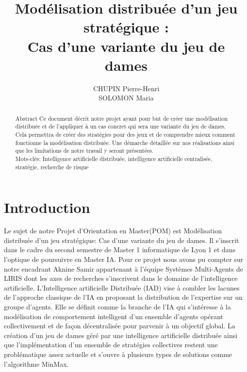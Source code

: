\documentclass[11pt]{article} %
\title{Modélisation distribuée d’un jeu stratégique : 
 \\ Cas d'une variante du jeu de dames}
\author{CHUPIN Pierre-Henri \\ SOLOMON Maria}
\date{} %
\begin{document}
\maketitle

\begin{abstract}
Abstract
Ce document décrit notre projet ayant pour  but  de  créer  une modélisation distribuée et de l'appliquer à un cas concret qui sera une variante du jeu de dames. Cela permettra de créer des stratégies pour des jeux et de comprendre mieux comment fonctionne la modélisation distribuée. Une démarche détaillée sur nos réalisations ainsi que les limitations de notre travail y seront présentées.  \\
Mots-clés: Intelligence artificielle distribuée, intelligence artificielle centralisée, stratégie, recherche de risque
\end{abstract}



\section{Introduction}
Le sujet de notre Projet d’Orientation en Master(POM) est Modélisation distribuée d’un jeu stratégique: Cas d'une variante du jeu de dames. Il s'inscrit dans le cadre du second semestre de Master 1 informatique de Lyon 1 et dans l'optique de poursuivre en Master IA. Pour ce projet nous avons pu compter sur notre encadrant Aknine Samir appartenant à l'équipe Systèmes Multi-Agents de LIRIS dont les axes de recherches s’inscrivent dans le domaine de l'intelligence artificielle. 
L’Intelligence artificielle Distribuée (IAD) vise à combler les lacunes de l’approche classique de l’IA en proposant la distribution de l’expertise sur un groupe d’agents.
Elle se définit comme la branche de l’IA qui s’intéresse à la modélisation de comportement intelligent d’un ensemble d’agents opérant collectivement et de façon décentralisée pour parvenir à un objectif global.
La création d’un jeu de dames géré par une intelligence artificielle distribuée ainsi que l'implémentation d’un ensemble de stratégies collectives restent une problématique assez actuelle et s’ouvre à plusieurs types de solutions comme l’algorithme MinMax. 
\end{document}
